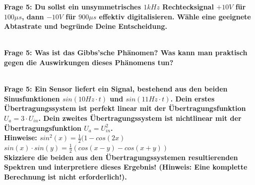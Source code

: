 \documentclass[11pt,a4paper]{scrartcl}
\begin{document}
\textbf{Frage 5: Du sollst ein unsymmetrisches $1kHz$ Rechtecksignal $+10V$ für $100\mu s$, dann $-10V$ für $900\mu s$ effektiv digitalisieren. Wähle eine geeignete Abtastrate und begründe Deine Entscheidung.}

\\

\textbf{Frage 5: Was ist das Gibbs'sche Phänomen? Was kann man praktisch gegen die Auswirkungen dieses Phänomens tun?}

\\

\textbf{Frage 5: Ein Sensor liefert ein Signal, bestehend aus den beiden Sinusfunktionen $sin (10Hz \cdot t)$ und $sin(11Hz \cdot t)$. Dein erstes Übertragungssystem ist perfekt linear mit der Übertragungsfunktion
$U_{a} = 3 \cdot U_{in}$. Dein zweites Übertragungssystem ist nichtlinear mit der Übertragungsfunktion $U_a =  U_{in}^2$. \\Hinweise: $sin^2(x)=\frac{1}{2}(1-cos(2x)$\\$sin(x)\cdot sin(y) = \frac{1}{2}(cos(x-y)-cos(x+y))$\\ Skizziere die beiden aus den Übertragungssystemen resultierenden Spektren und
interpretiere dieses Ergebnis! (Hinweis: Eine komplette Berechnung ist nicht erforderlich!).}
\end{document}
